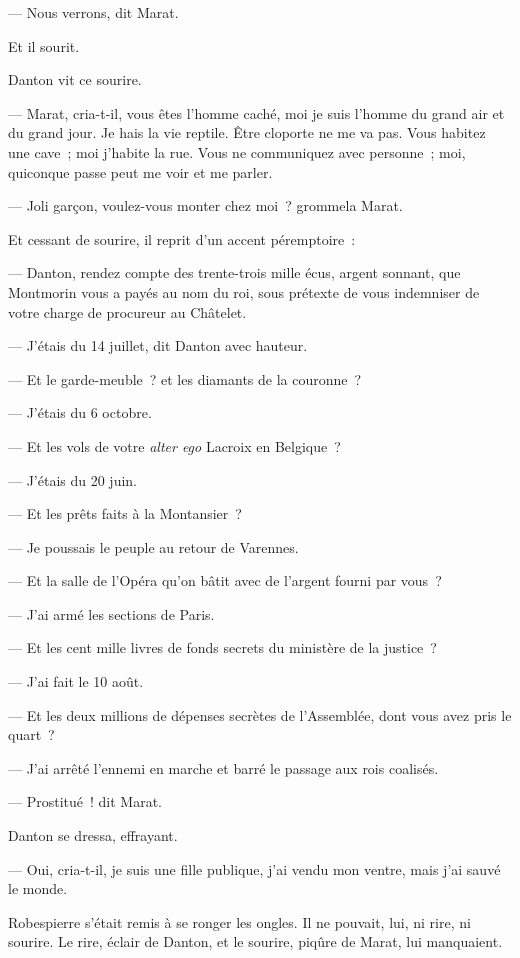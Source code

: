 \documentclass[french,twoside]{book} %
\begin{document}
— Nous verrons, dit Marat.\par
Et il sourit.\par
Danton vit ce sourire.\par
— Marat, cria-t-il, vous êtes l’homme caché, moi je suis l’homme du grand air et du grand jour. Je hais la vie reptile. Être cloporte ne me va pas. Vous habitez une cave ; moi j’habite la rue. Vous ne communiquez avec personne ; moi, quiconque passe peut me voir et me parler.\par
— Joli garçon, voulez-vous monter chez moi ? grommela Marat.\par
Et cessant de sourire, il reprit d’un accent péremptoire :\par
— Danton, rendez compte des trente-trois mille écus, argent sonnant, que Montmorin vous a payés au nom du roi, sous prétexte de vous indemniser de votre charge de procureur au Châtelet.\par
— J’étais du 14 juillet, dit Danton avec hauteur.\par
— Et le garde-meuble ? et les diamants de la couronne ?\par
— J’étais du 6 octobre.\par
— Et les vols de votre \emph{alter ego} Lacroix en Belgique ?\par
— J’étais du 20 juin.\par
— Et les prêts faits à la Montansier ?\par
— Je poussais le peuple au retour de Varennes.\par
 — Et la salle de l’Opéra qu’on bâtit avec de l’argent fourni par vous ?\par
— J’ai armé les sections de Paris.\par
— Et les cent mille livres de fonds secrets du ministère de la justice ?\par
— J’ai fait le 10 août.\par
— Et les deux millions de dépenses secrètes de l’Assemblée, dont vous avez pris le quart ?\par
— J’ai arrêté l’ennemi en marche et barré le passage aux rois coalisés.\par
— Prostitué ! dit Marat.\par
Danton se dressa, effrayant.\par
— Oui, cria-t-il, je suis une fille publique, j’ai vendu mon ventre, mais j’ai sauvé le monde.\par
Robespierre s’était remis à se ronger les ongles. Il ne pouvait, lui, ni rire, ni sourire. Le rire, éclair de Danton, et le sourire, piqûre de Marat, lui manquaient.\par
\end{document}
